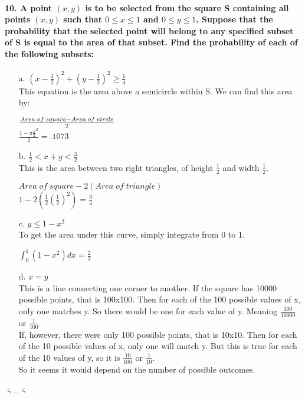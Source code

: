 \documentclass{article}
\begin{document}
\paragraph{10. A point $(x, y)$ is to be selected from the square S containing
all points $(x, y)$ such that $0 \leq x \leq 1$ and $0 \leq y \leq 1$. Suppose that
the probability that the selected point will belong to any specified subset of S is
equal to the area of that subset. Find the probability of each of the following subsets:}
\begin{enumerate}
\item[a.] $(x-\frac{1}{2})^2 + (y-\frac{1}{2})^2 \geq \frac{1}{4}$\\
This equation is the area above a semicircle within S. We can find this area by:
\begin{center}
$Area\; of\; square - Area\; of\; circle \over 2$\\
$\boxed{\frac{1-\pi\frac{1}{2}^2}{2} = .1073}$
\end{center}

\item[b.] $\frac{1}{2} < x + y < \frac{3}{2}$\\
This is the area between two right triangles, of height $\frac{1}{2}$ and width
$\frac{1}{2}$.
\begin{center}
$Area\; of\; square - 2(Area\; of\; triangle)$\\
$\boxed{1-2\left(\frac{1}{2}\left(\frac{1}{2}\right)^2\right) = \frac{3}{4}}$
\end{center}

\item[c.] $y \leq 1-x^2$\\
To get the area under this curve, simply integrate from 0 to 1.
\begin{center}
$\boxed{\int_0^1(1-x^2)dx = \frac{2}{3}}$
\end{center}

\item[d.] $x=y$\\
This is a line connecting one corner to another. If the square has 10000 possible 
points, that is 100x100. Then for each of the 100 possible values of x, only one 
matches y. So there would be one for each value of y. Meaning 
$\frac{100}{10000}$ or $\frac{1}{100}$.\\
If, however, there were only 100 possible points, that is 10x10. Then for each
of the 10 possible values of x, only one will match y. But this is true for each of
the 10 values of y, so it is $\frac{10}{100}$ or $\frac{1}{10}$.\\
So it seems it would depend on the number of possible outcomes.\\
\end{enumerate}

\begin{center}
$\upvarsigma$\_$\upvarsigma$
\end{center}
\end{document}
